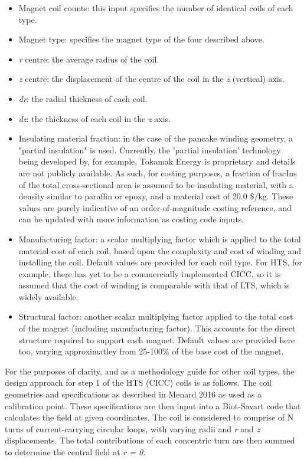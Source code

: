 \begin{itemize}
    \item Magnet coil counts: this input specifies the number of identical coils of each type.
    \item Magnet type: specifies the magnet type of the four described above.
    \item \textit{r} centre: the average radius of the coil.
    \item \textit{z} centre: the displacement of the centre of the coil in the \textit{z} (vertical) axis.
    \item \textit{dr}: the radial thickness of each coil.
    \item \textit{dz}: the thickness of each coil in the \textit{z} axis.
    \item Insulating material fraction: in the case of the pancake winding geometry, a "partial insulation" is used. Currently, the 'partial insulation' technology being developed by, for example, Tokamak Energy is proprietary and details are not publicly available. As such, for costing purposes, a fraction of fracIns of the total cross-sectional area is assumed to be insulating material, with a density similar to paraffin or epoxy, and a material cost of 20.0 \$/kg. These values are purely indicative of an order-of-magnitude costing reference, and can be updated with more information as costing code inputs.
    \item Manufacturing factor: a scalar multiplying factor which is applied to the total material cost of each coil, based upon the complexity and cost of winding and installing the coil. Default values are provided for each coil type. For HTS, for example, there has yet to be a commercially implemented CICC, so it is assumed that the cost of winding is comparable with that of LTS, which is widely available. 
    \item Structural factor: another scalar multiplying factor applied to the total cost of the magnet (including manufacturing factor). This accounts for the direct structure required to support each magnet. Default values are provided here too, varying approximatley from 25-100\% of the base cost of the magnet.
\end{itemize}

For the purposes of clarity, and as a methodology guide for other coil types, the design approach for step 1 of the HTS (CICC) coils is as follows. The coil geometries and specifications as described in Menard 2016 \cite{Menard2016} as used as a calibration point. These specifications are then input into a Biot-Savart code that calculates the field at given coordinates. The coil is considered to comprise of N turns of current-carrying circular loops, with varying radii and \textit{r} and \textit{z} displacements. The total contributions of each concentric turn are then summed to determine the central field at \textit{r = 0}.\\

